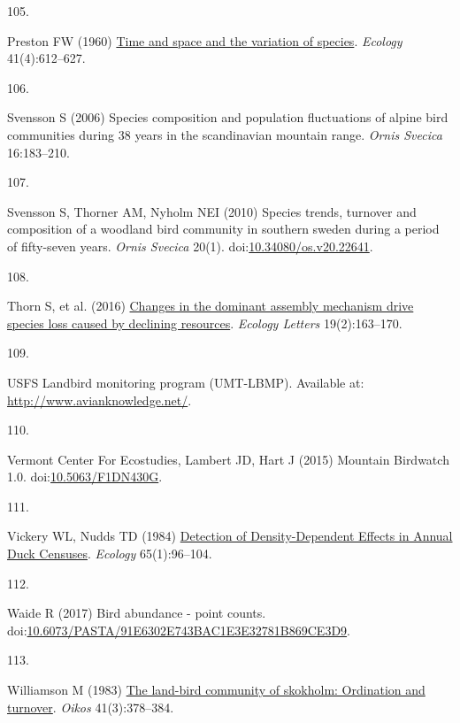 \documentclass{article}
\newlength{\cslhangindent}
\newlength{\csllabelwidth}
\newlength{\cslentryspacingunit} %
\newenvironment{CSLReferences}[2] %
 {%
  \setlength{\parindent}{0pt}
  \ifodd #1
  \let\oldpar\par
  \def\par{\hangindent=\cslhangindent\oldpar}
  \fi
  \setlength{\parskip}{#2\cslentryspacingunit}
 }%
 {}
\newcommand{\CSLLeftMargin}[1]{\parbox[t]{\csllabelwidth}{#1}}
\newcommand{\CSLRightInline}[1]{\parbox[t]{\linewidth - \csllabelwidth}{#1}\break}
\begin{document}
\begin{CSLReferences}{0}{0}
\leavevmode{}%
\CSLLeftMargin{105. }%
\CSLRightInline{Preston FW (1960)
\href{https://doi.org/10.2307/1931793}{Time and space and the variation
of species}. \emph{Ecology} 41(4):612--627.}

\leavevmode{}%
\CSLLeftMargin{106. }%
\CSLRightInline{Svensson S (2006) Species composition and population
fluctuations of alpine bird communities during 38 years in the
scandinavian mountain range. \emph{Ornis Svecica} 16:183--210.}

\leavevmode{}%
\CSLLeftMargin{107. }%
\CSLRightInline{Svensson S, Thorner AM, Nyholm NEI (2010) Species
trends, turnover and composition of a woodland bird community in
southern sweden during a period of fifty-seven years. \emph{Ornis
Svecica} 20(1).
doi:\href{https://doi.org/10.34080/os.v20.22641}{10.34080/os.v20.22641}.}

\leavevmode{}%
\CSLLeftMargin{108. }%
\CSLRightInline{Thorn S, et al. (2016)
\href{https://doi.org/10.1111/ele.12548}{Changes in the dominant
assembly mechanism drive species loss caused by declining resources}.
\emph{Ecology Letters} 19(2):163--170.}

\leavevmode{}%
\CSLLeftMargin{109. }%
\CSLRightInline{USFS Landbird monitoring program (UMT-LBMP). Available
at: \url{http://www.avianknowledge.net/}.}

\leavevmode{}%
\CSLLeftMargin{110. }%
\CSLRightInline{Vermont Center For Ecostudies, Lambert JD, Hart J (2015)
Mountain Birdwatch 1.0.
doi:\href{https://doi.org/10.5063/F1DN430G}{10.5063/F1DN430G}.}

\leavevmode{}%
\CSLLeftMargin{111. }%
\CSLRightInline{Vickery WL, Nudds TD (1984)
\href{https://doi.org/10.2307/1939462}{Detection of Density-Dependent
Effects in Annual Duck Censuses}. \emph{Ecology} 65(1):96--104.}

\leavevmode{}%
\CSLLeftMargin{112. }%
\CSLRightInline{Waide R (2017) Bird abundance - point counts.
doi:\href{https://doi.org/10.6073/PASTA/91E6302E743BAC1E3E32781B869CE3D9}{10.6073/PASTA/91E6302E743BAC1E3E32781B869CE3D9}.}

\leavevmode{}%
\CSLLeftMargin{113. }%
\CSLRightInline{Williamson M (1983)
\href{https://doi.org/10.2307/3544096}{The land-bird community of
skokholm: Ordination and turnover}. \emph{Oikos} 41(3):378--384.}


\end{CSLReferences}
\end{document}
